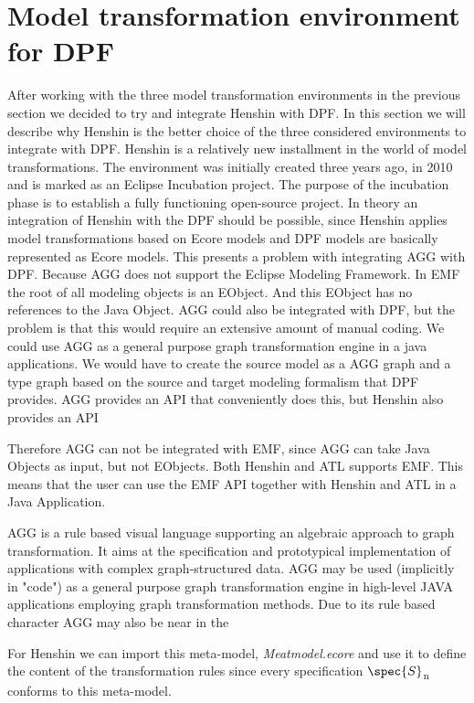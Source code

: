 \section{Model transformation environment for DPF}
\label{tool_choice}

After working with the three model transformation environments in the previous
section we decided to try and integrate Henshin with DPF. In this section we
will describe why Henshin is the better choice of the three considered
environments to integrate with DPF. Henshin\cite{Henshin_2010,Henshin} is a
relatively new installment in the world of model transformations. The
environment was initially created three years ago, in 2010 and is marked as an
Eclipse Incubation project. The purpose of the incubation phase is to establish
a fully functioning open-source project. In theory an integration of Henshin
with the DPF should be possible, since Henshin applies model transformations
based on Ecore models and DPF models are basically represented as Ecore
models. This presents a problem with integrating AGG with DPF. Because AGG does
not support the Eclipse Modeling Framework. In EMF the root of all modeling
objects is an EObject. And this EObject has no references to the Java Object.
AGG could also be integrated with DPF, but the problem is that this would
require an extensive amount of manual coding. We could use AGG as a general
purpose graph transformation engine in a java applications. We would have to
create the source model as a AGG graph and a type graph based on the source and
target modeling formalism that DPF provides. AGG provides an API that
conveniently does this, but Henshin also provides an API 

Therefore AGG can not be integrated with EMF, since AGG can take Java Objects
as input, but not EObjects. Both Henshin and ATL supports EMF. This means that
the user can use the EMF API together with Henshin and ATL in a Java
Application.

AGG is a rule based visual language supporting an algebraic approach to graph
transformation. It aims at the specification and prototypical implementation of
applications with complex graph-structured data. AGG may be used (implicitly in
"code") as a general purpose graph transformation engine in high-level JAVA
applications employing graph transformation methods. Due to its rule based
character AGG may also be near in the

For Henshin we can import this meta-model, \textit{Meatmodel.ecore} and use it
to define the content of the transformation rules since every specification
$\spec{S}$\textsubscript{n} conforms to this meta-model.

